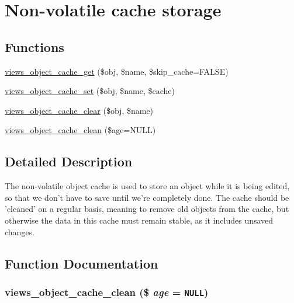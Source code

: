 \hypertarget{group__views__object__cache}{
\section{Non-volatile cache storage}
\label{group__views__object__cache}
}
\subsection*{Functions}
\begin{CompactItemize}
\item 
\hyperlink{group__views__object__cache_gd5f513bc1c239a13aa96905361ef3e96}{views\_\-object\_\-cache\_\-get} (\$obj, \$name, \$skip\_\-cache=FALSE)
\item 
\hyperlink{group__views__object__cache_ga26af6a03e0d169966b2a7fa2b09d75e}{views\_\-object\_\-cache\_\-set} (\$obj, \$name, \$cache)
\item 
\hyperlink{group__views__object__cache_g459b053443336216db7aa476065893e5}{views\_\-object\_\-cache\_\-clear} (\$obj, \$name)
\item 
\hyperlink{group__views__object__cache_g87df7081c8cc1152a0d0de057e2e6786}{views\_\-object\_\-cache\_\-clean} (\$age=NULL)
\end{CompactItemize}


\subsection{Detailed Description}
The non-volatile object cache is used to store an object while it is being edited, so that we don't have to save until we're completely done. The cache should be 'cleaned' on a regular basis, meaning to remove old objects from the cache, but otherwise the data in this cache must remain stable, as it includes unsaved changes. 

\subsection{Function Documentation}
\hypertarget{group__views__object__cache_g87df7081c8cc1152a0d0de057e2e6786}{
\subsubsection[{views\_\-object\_\-cache\_\-clean}]{\setlength{\rightskip}{0pt plus 5cm}views\_\-object\_\-cache\_\-clean (\$ {\em age} = {\tt NULL})}}
\label{group__views__object__cache_g87df7081c8cc1152a0d0de057e2e6786}


